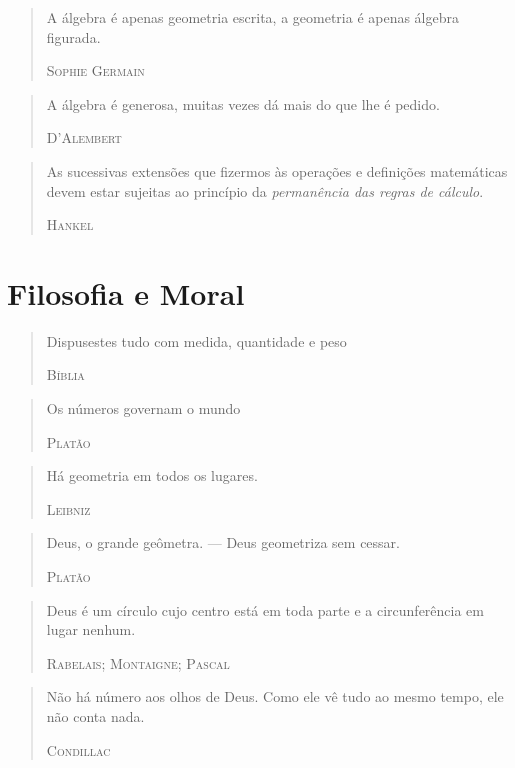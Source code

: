 \documentclass{hipatia}
\begin{document}
\begin{quote}
A álgebra é apenas geometria escrita, a geometria é apenas álgebra figurada.

\hfill \textsc{Sophie Germain}
\end{quote}
 


\begin{quote}
    A álgebra é generosa, muitas vezes dá mais do que lhe é pedido.
    
\hfill \textsc{D'Alembert}
\end{quote}

 
\begin{quote}
As sucessivas extensões que fizermos às operações e definições matemáticas devem estar sujeitas ao princípio da \emph{permanência das regras de cálculo}.

\hfill \textsc{Hankel}
\end{quote}
 
\section{Filosofia e Moral}

\begin{quote}
Dispusestes tudo com medida, quantidade e peso

\hfill \textsc{Bíblia}
\end{quote}

\begin{quote}
Os números governam o mundo

\hfill \textsc{Platão}
\end{quote}
 
\begin{quote}
Há geometria em todos os lugares.

\hfill \textsc{Leibniz}
\end{quote}

 
\begin{quote}
Deus, o grande geômetra. --- Deus geometriza sem cessar.

\hfill \textsc{Platão}
\end{quote}
 

\begin{quote}
Deus é um círculo cujo centro está em toda parte e a circunferência em lugar nenhum.

\hfill \textsc{Rabelais; Montaigne; Pascal}
\end{quote}



\begin{quote}
Não há número aos olhos de Deus. Como ele vê tudo ao mesmo tempo, ele não conta nada.

\hfill \textsc{Condillac}
\end{quote}
\end{document}
